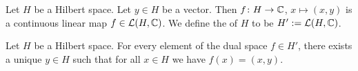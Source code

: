 
\lecture{}

\begin{definition}
Let $H$ be a Hilbert space. Let $y\in H$ be a vector.
Then $f\colon H\to\mathbb{C}$, $x\mapsto(x,y)$ is a continuous linear map $f\in\mathcal{L}(H,\mathbb{C})$.
We define the  of $H$ to be $H' := \mathcal{L}(H,\mathbb{C})$.
\end{definition}

\begin{theorem}
Let $H$ be a Hilbert space. 
For every element of the dual space $f\in H'$,
there exists a unique $y\in H$ such that for all $x\in H$ we have $f(x)=(x,y)$.
\end{theorem}

